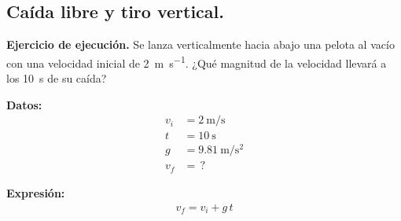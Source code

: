 \documentclass[12pt, letter]{exam}
\begin{document}
\begin{questions}


    \section{Caída libre y tiro vertical.}

    \setcounter{question}{8} \question \label{Ejercicio_05} \textbf{Ejercicio de ejecución.} Se lanza verticalmente hacia abajo una pelota al vacío con una velocidad inicial de \SI{2}{\meter\per\second}. ¿Qué magnitud de la velocidad llevará a los \SI{10}{\second} de su caída?
    
    \vspace*{0.3cm}
    \begin{minipage}[t]{0.4\linewidth}
    \textbf{Datos:}
    \begin{align*}
    v_{i} &= \SI{2}{\meter\per\second} \\
    t &= \SI{10}{\second} \\
    g &= \SI{9.81}{\meter\per\square\second} \\
    v_{f} &= \, ?
    \end{align*}
    \end{minipage}
    \hspace{1cm}
    \begin{minipage}[t]{0.4\linewidth}
    \textbf{Expresión:}
    \begin{align*}
    v_{f} = v_{i} + g \, t
    \end{align*}
    \end{minipage}


\end{questions}
\end{document}
